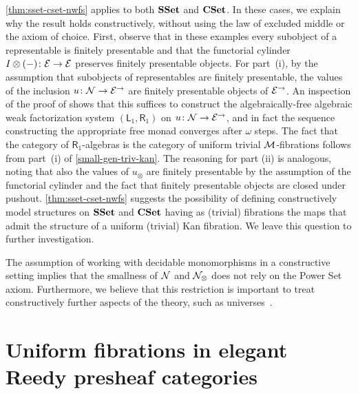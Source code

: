 \documentclass[reqno,10pt,a4paper,oneside,draft]{amsart}
\begin{document}
\begin{remark} \label{rem:constructive-small-object}
\cref{thm:sset-cset-nwfs} applies to both $\SSet$ and $\CSet$. In these cases, we explain why the result holds constructively, \ie without using 
the law of excluded middle or the axiom of choice. 
First, observe that in these examples every subobject of a representable is finitely presentable and that the functorial cylinder $\interval \otimes (-) \co \cal{E} \to \cal{E}$ preserves finitely presentable objects. For part~(i), by the assumption that subobjects of representables are finitely presentable, the values of the inclusion $u \co \cal{N} \to \cal{E}^\to$ are finitely presentable objects of $\cal{E}^\to$.
An inspection of the proof of \cite[Theorem~4.4]{garner:small-object-argument} shows that this suffices to construct the algebraically-free algebraic weak factorization system $(\mathsf{L}_1, \mathsf{R}_1)$ on $u \co \cal{N} \to \cal{E}^\to$, and in fact the sequence constructing the appropriate free monad converges after $\omega$ steps. 
The fact that the category of $\mathsf{R}_1$-algebras is the category of uniform trivial $\cal{M}$-fibrations follows from part~(i) of \cref{small-gen-triv-kan}.
The reasoning for part (ii) is analogous, noting that also the values of $u_\otimes$ are finitely presentable by the assumption of the functorial cylinder and the fact that finitely presentable objects are closed under pushout. \cref{thm:sset-cset-nwfs} suggests the possibility of defining constructively model structures on $\SSet$ and $\CSet$ having as (trivial) fibrations the maps that admit the structure of a uniform (trivial) Kan fibration.
We leave this question to further investigation. 

The assumption of working with decidable monomorphisms in a constructive setting implies that
the smallness of $\cal{N}$ and $\cal{N}_\otimes$ does not rely on the Power Set axiom. Furthermore,
we believe that this restriction is important to treat constructively further aspects of the theory,
such as universes~\cite{cohen-et-al:cubicaltt}.
\end{remark} 





\section{Uniform fibrations in elegant Reedy presheaf categories}
\label{sec:non-alg}
\end{document}
